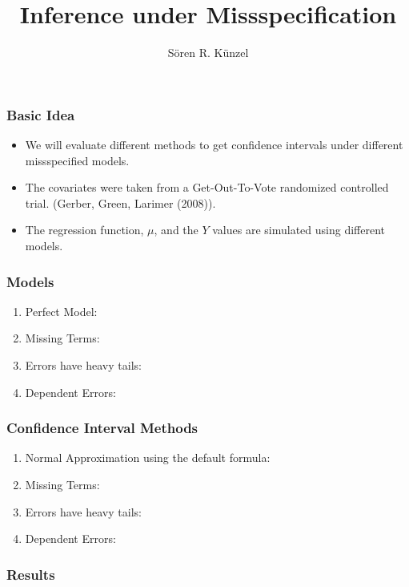 \documentclass[11pt]{beamer}
\begin{document}
	\author{S\"oren R. K\"unzel}
	\title{Inference under Missspecification}
	\begin{frame}[plain]
	\maketitle
\end{frame}

\begin{frame}
\frametitle{Basic Idea}
\begin{itemize}
	\item We will evaluate different methods to get confidence intervals under different missspecified models. 
	\item The covariates were taken from a Get-Out-To-Vote randomized controlled trial. (Gerber, Green, Larimer (2008)). 
	\item The regression function, $\mu$, and the $Y$ values are simulated using different models. 
\end{itemize}

\end{frame}

\begin{frame}
	\frametitle{Models}
	\begin{enumerate}
		\item Perfect Model:
		\item Missing Terms:
		\item Errors have heavy tails:
		\item Dependent Errors:
	\end{enumerate}
\end{frame}

\begin{frame}
\frametitle{Confidence Interval Methods}
\begin{enumerate}
	\item Normal Approximation using the default formula:
	\item Missing Terms:
	\item Errors have heavy tails:
	\item Dependent Errors:
\end{enumerate}
\end{frame}


\begin{frame}
\frametitle{Results}

\end{frame}
\end{document}
